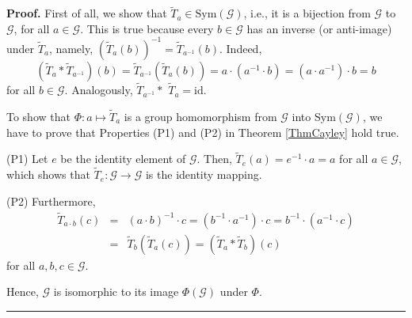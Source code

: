 \documentclass[%
 aip,
 amsmath,amssymb,
 reprint,%
]{revtex4-1}
\newenvironment{proof}[1][Proof]{\noindent\textbf{#1.} }{\ \rule{0.5em}{0.5em}}
\begin{document}
\begin{proof}
First of all, we show that $\tilde{T}_{a}\in \mathrm{Sym}(\mathcal{G})$,
i.e., it is a bijection from $\mathcal{G}$ to $\mathcal{G}$, for all $a\in 
\mathcal{G}$. This is true because every $b\in \mathcal{G}$ has an inverse
(or anti-image) under $\tilde{T}_{a}$, namely, $(\tilde{T}_{a}(b))^{-1}=%
\tilde{T}_{a^{-1}}(b)$. Indeed,%
\begin{equation*}
(\tilde{T}_{a}\ast \tilde{T}_{a^{-1}})(b)=\tilde{T}_{a^{-1}}(\tilde{T}%
_{a}(b))=a\cdot (a^{-1}\cdot b)=(a\cdot a^{-1})\cdot b=b
\end{equation*}%
for all $b\in \mathcal{G}$. Analogously, $\tilde{T}_{a^{-1}}\ast $ $\tilde{T}%
_{a}=\mathrm{id}.$

To show that $\Phi :a\mapsto \tilde{T}_{a}$ is a group homomorphism from $%
\mathcal{G}$ into $\mathrm{Sym}(\mathcal{G})$, we have to prove that
Properties (P1) and (P2) in Theorem \ref{ThmCayley} hold true.

(P1) Let $e$ be the identity element of $\mathcal{G}$. Then, $\tilde{T}%
_{e}(a)=e^{-1}\cdot a=a$ for all $a\in \mathcal{G}$, which shows that $%
\tilde{T}_{e}:\mathcal{G}\rightarrow \mathcal{G}$ is the identity mapping.

(P2) Furthermore,%
\begin{eqnarray*}
\tilde{T}_{a\cdot b}(c) &=&(a\cdot b)^{-1}\cdot c=(b^{-1}\cdot a^{-1})\cdot
c=b^{-1}\cdot (a^{-1}\cdot c) \\
&=&\tilde{T}_{b}(\tilde{T}_{a}(c))=(\tilde{T}_{a}\ast \tilde{T}_{b})(c)
\end{eqnarray*}%
for all $a,b,c\in \mathcal{G}$.

Hence, $\mathcal{G}$ is isomorphic to its image $\Phi (\mathcal{G})$ under $%
\Phi $.
\end{proof}

\bigskip
\end{document}
